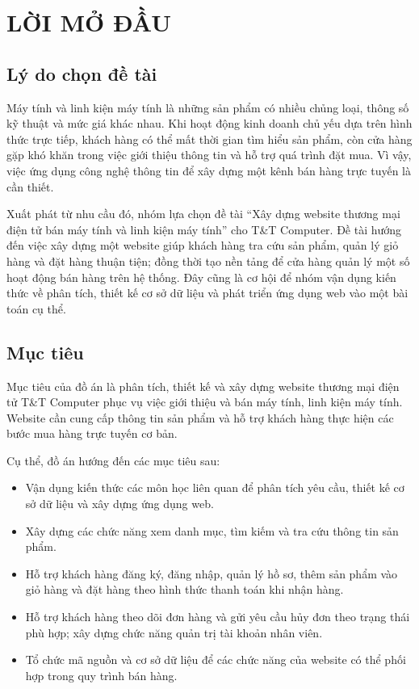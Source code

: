 \chapter*{LỜI MỞ ĐẦU}\label{loimodau_intro}
\vspace{-40pt}

\renewcommand{\thesection}{\arabic{section}} %
\section{Lý do chọn đề tài}
Máy tính và linh kiện máy tính là những sản phẩm có nhiều chủng loại, thông số kỹ thuật và mức giá khác nhau. Khi hoạt động kinh doanh chủ yếu dựa trên hình thức trực tiếp, khách hàng có thể mất thời gian tìm hiểu sản phẩm, còn cửa hàng gặp khó khăn trong việc giới thiệu thông tin và hỗ trợ quá trình đặt mua. Vì vậy, việc ứng dụng công nghệ thông tin để xây dựng một kênh bán hàng trực tuyến là cần thiết.

Xuất phát từ nhu cầu đó, nhóm lựa chọn đề tài ``Xây dựng website thương mại điện tử bán máy tính và linh kiện máy tính'' cho T\&T Computer. Đề tài hướng đến việc xây dựng một website giúp khách hàng tra cứu sản phẩm, quản lý giỏ hàng và đặt hàng thuận tiện; đồng thời tạo nền tảng để cửa hàng quản lý một số hoạt động bán hàng trên hệ thống. Đây cũng là cơ hội để nhóm vận dụng kiến thức về phân tích, thiết kế cơ sở dữ liệu và phát triển ứng dụng web vào một bài toán cụ thể.
\section{Mục tiêu}
Mục tiêu của đồ án là phân tích, thiết kế và xây dựng website thương mại điện tử T\&T Computer phục vụ việc giới thiệu và bán máy tính, linh kiện máy tính. Website cần cung cấp thông tin sản phẩm và hỗ trợ khách hàng thực hiện các bước mua hàng trực tuyến cơ bản.

Cụ thể, đồ án hướng đến các mục tiêu sau:
\begin{itemize}
    \item Vận dụng kiến thức các môn học liên quan để phân tích yêu cầu, thiết kế cơ sở dữ liệu và xây dựng ứng dụng web.
    \item Xây dựng các chức năng xem danh mục, tìm kiếm và tra cứu thông tin sản phẩm.
    \item Hỗ trợ khách hàng đăng ký, đăng nhập, quản lý hồ sơ, thêm sản phẩm vào giỏ hàng và đặt hàng theo hình thức thanh toán khi nhận hàng.
    \item Hỗ trợ khách hàng theo dõi đơn hàng và gửi yêu cầu hủy đơn theo trạng thái phù hợp; xây dựng chức năng quản trị tài khoản nhân viên.
    \item Tổ chức mã nguồn và cơ sở dữ liệu để các chức năng của website có thể phối hợp trong quy trình bán hàng.
\end{itemize}
